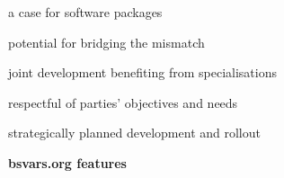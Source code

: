 \documentclass[aspectratio=1610,notes,blackandwhite,mathsans,usenames,dvipsnames]{beamer}
\begin{document}
	
	
	\begin{frame}{\huge a case for software packages}
		\Large
		
		\begin{itemize}[label=$\blacktriangleright$]
		{\color{lig}
			\item potential for bridging the mismatch\\[1ex]
			\item joint development benefiting from specialisations\\[1ex]
			\item respectful of parties' objectives and needs \\[1ex]
			\item strategically planned development and rollout
		}	
		\end{itemize}
	\end{frame}

	
	
	
	
	
	{
		\begin{frame}
			\centering
			
			\vspace{1cm}\Huge
			\textbf{{\color{whi}bsvars.org features}}
			
		\end{frame}
	}	

	
	
\end{document}
